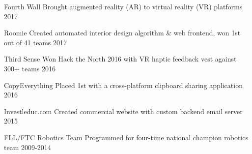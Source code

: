 


\begin{cvhonors}

\cvhonor
{Fourth Wall} %
{Brought augmented reality (AR) to virtual reality (VR) platforms} %
{} %
{2017} %

\cvhonor
{Roomie} %
{Created automated interior design algorithm \& web frontend, won 1st out of 41 teams} %
{} %
{2017} %

\cvhonor
{Third Sense} %
{Won Hack the North 2016 with VR haptic feedback vest against 300+ teams} %
{} %
{2016} %

\cvhonor
{CopyEverything} %
{Placed 1st with a cross-platform clipboard sharing application} %
{} %
{2016} %

\cvhonor
{Investleduc.com} %
{Created commercial website with custom backend email server} %
{} %
{2015} %

\cvhonor
{FLL/FTC Robotics Team} %
{Programmed for four-time national champion robotics team} %
{} %
{2009-2014} %


\end{cvhonors}
